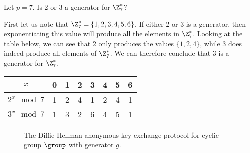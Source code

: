 \begin{example}
	Let $p=7$. Is 2 or 3 a generator for $\Z_7^*$?
	
	First let us note that $\Z_7^* = \{1,2,3,4,5,6\}$. If either 2 or 3 is a generator, then exponentiating this value will produce all the elements in $\Z_7^*$. Looking at the table below, we can see that 2 only produces the values $\{1,2,4\}$, while 3 does indeed produce all elements of $\Z_7^*$. We can therefore conclude that 3 is a generator for $\Z_7^*$. 
	\begin{center}
	\begin{tabular}{|c|c|c|c|c|c|c|c|}
		\hline
		$x$ & 0 & 1 & 2 & 3 & 4 & 5 & 6 \\
		\hline \hline
		$2^x \mod 7$ & 1 & 2 & 4 & 1 & 2 & 4 & 1 \\
		\hline
		$3^x \mod 7$ & 1 & 3 & 2 & 6 & 4 & 5 & 1 \\
		\hline
	\end{tabular}
	\end{center}
\end{example}

\begin{figure}
	\center
	\caption{The Diffie-Hellman anonymous key exchange protocol for cyclic group $\group$ with generator $g$.}
	\label{fig:DHKE}
\end{figure}

